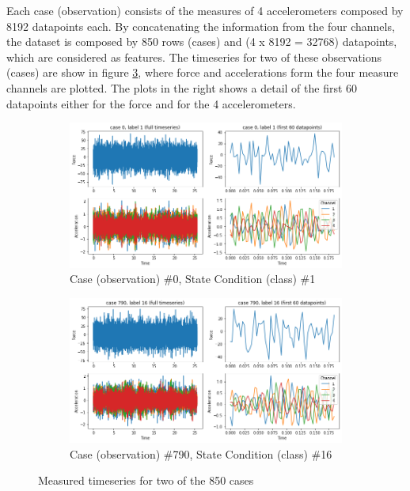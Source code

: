 \documentclass[twocolumn]{article}
\begin{document}
Each case (observation) consists of the measures of 4 accelerometers composed by 8192 datapoints each. By concatenating the information from the four channels, the dataset is composed by 850 rows (cases) and (4 x 8192 = 32768) datapoints, which are considered as features. The timeseries for two of these observations (cases) are show in figure \ref{fig:cases_000_790}, where force and accelerations form the four measure channels are plotted. The plots in the right shows a detail of the first 60 datapoints either for the force and for the 4 accelerometers.

\begin{figure}[H]
      \centering
      \begin{subfigure}{0.4\textwidth}
            \includegraphics[width=\textwidth]{case_000.png}
            \caption{Case (observation) \#0, State Condition (class) \#1}
            \label{fig:case_000}
      \end{subfigure}
      \begin{subfigure}{0.4\textwidth}
            \centering
            \includegraphics[width=\textwidth]{case_790.png}
            \caption{Case (observation) \#790, State Condition (class) \#16}
            \label{fig:case_790}
      \end{subfigure}
      \caption{Measured timeseries for two of the 850 cases}
      \label{fig:cases_000_790}
\end{figure}
\end{document}

